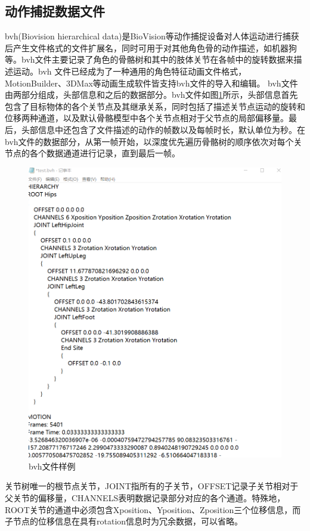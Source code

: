 \subsection{动作捕捉数据文件}{}
bvh(Biovision hierarchical data)是BioVision等动作捕捉设备对人体运动进行捕获后产生文件格式的文件扩展名，同时可用于对其他角色骨的动作描述，如机器狗等。bvh文件主要记录了角色的骨骼树和其中的肢体关节在各帧中的旋转数据来描述运动。bvh 文件已经成为了一种通用的角色特征动画文件格式，MotionBuilder、3DMax等动画生成软件皆支持bvh文件的导入和编辑。
bvh文件由两部分组成，头部信息和之后的数据部分。bvh文件如图\ref{fig:f15}所示，头部信息首先包含了目标物体的各个关节点及其继承关系，同时包括了描述关节点运动的旋转和位移两种通道，以及默认骨骼模型中各个关节点相对于父节点的局部偏移量。最后，头部信息中还包含了文件描述的动作的帧数以及每帧时长，默认单位为秒。在bvh文件的数据部分，从第一帧开始，以深度优先遍历骨骼树的顺序依次对每个关节点的各个数据通道进行记录，直到最后一帧。
\begin{figure}[h]
	\centering
	\includegraphics[scale=0.4]{figures/15.png}
	\caption{bvh文件样例}
	\label{fig:f15}
\end{figure}
关节树唯一的根节点关节，JOINT指所有的子关节，OFFSET记录子关节相对于父关节的偏移量，CHANNELS表明数据记录部分对应的各个通道。特殊地，ROOT关节的通道中必须包含Xposition、Yposition、Zposition三个位移信息，而子节点的位移信息在具有rotation信息时为冗余数据，可以省略。

